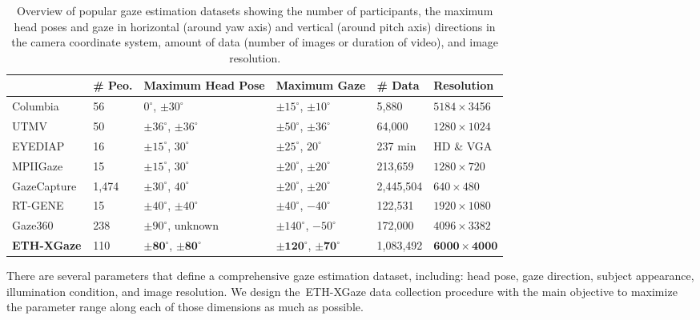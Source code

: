 \documentclass[runningheads]{llncs}
\newcommand{\datasetname}{ETH-XGaze\xspace}
\newcommand{\numparticipant}{110\xspace}
\newcommand{\numsample}{1,083,492\xspace}
\begin{document}
\begin{table}[t]
\centering
\begin{tabularx}{\textwidth}{P{2.1cm} C{1.5cm} C{2.2cm} C{2.2cm} C{1.8cm} C{1.9cm}}
\toprule
& \textbf{\# Peo.} & \textbf{Maximum Head Pose} & \textbf{Maximum Gaze} & \textbf{\# Data} & \textbf{Resolution} \\
\midrule
Columbia~\cite{smith2013gaze} & 56 & $0^{\circ}$, $\pm30^{\circ}$ & $\pm15^{\circ}$, $\pm10^{\circ}$ & 5,880 & $5184\times$3456 \\
UTMV~\cite{sugano2014learning} & 50 & $\pm36^{\circ}$, $\pm36^{\circ}$ & $\pm50^{\circ}$, $\pm36^{\circ}$ & 64,000 & $1280\times1024$\\
EYEDIAP~\cite{funes2014eyediap} & 16 & $\pm15^{\circ}$, $30^{\circ}$ & $\pm25^{\circ}$, $20^{\circ}$ & 237 min & HD \& VGA \\
MPIIGaze~\cite{zhang2019mpiigaze} & 15 & $\pm15^{\circ}$, $30^{\circ}$ & $\pm20^{\circ}$, $\pm20^{\circ}$ & 213,659 & $1280\times720$ \\
GazeCapture~\cite{krafka2016eye} & 1,474 & $\pm30^{\circ}$, $40^{\circ}$ & $\pm20^{\circ}$, $\pm20^{\circ}$ & 2,445,504 & $640\times480$\\
RT-GENE~\cite{fischer2018rt} & 15 & $\pm40^{\circ}$, $\pm40^{\circ}$ & $\pm40^{\circ}$, $-40^{\circ}$ & 122,531 & $1920\times1080$\\
Gaze360~\cite{kellnhofer2019gaze360} & 238 & $\pm90^{\circ}$, unknown & $\pm140^{\circ}$, $-50^{\circ}$ & 172,000 & $4096\times3382$ \\
\midrule
\textbf{\datasetname} & \numparticipant & $\bm{\pm80^{\circ}}$, $\bm{\pm80^{\circ}}$ & $\bm{\pm120^{\circ}}$, $\bm{\pm70^{\circ}}$ & \numsample & $\bm{6000\times4000}$ \\
\bottomrule
\end{tabularx}
\caption{Overview of popular gaze estimation datasets showing the number of participants, the maximum head poses and gaze in horizontal (around yaw axis) and vertical (around pitch axis) directions in the camera coordinate system, amount of data (number of images or duration of video), and image resolution.}
\label{tab:other_datasets}
\end{table}

\noindent There are several parameters that define a comprehensive gaze estimation dataset, including: head pose, gaze direction, subject appearance, illumination condition, and image resolution.
We design the~\datasetname data collection procedure with the main objective to maximize the parameter range along each of those dimensions as much as possible.
\end{document}
